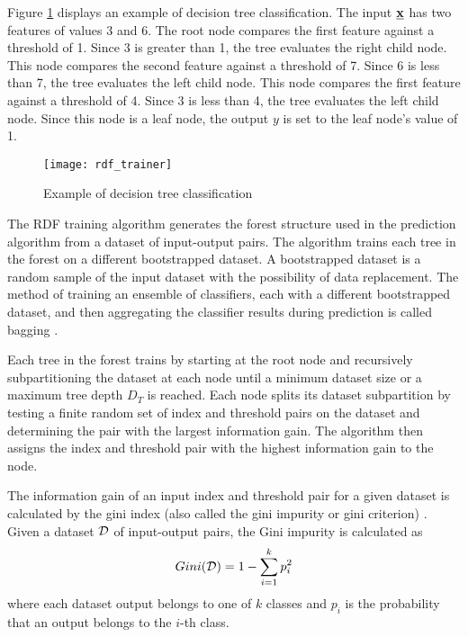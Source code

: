Figure \ref{fig:rdf_example} displays an example of decision tree classification. The input $\underline{\mathbf{x}}$ has two features of values 3 and 6. The root node compares the first feature against a threshold of 1. Since 3 is greater than 1, the tree evaluates the right child node. This node compares the second feature against a threshold of 7. Since 6 is less than 7, the tree evaluates the left child node. This node compares the first feature against a threshold of 4. Since 3 is less than 4, the tree evaluates the left child node. Since this node is a leaf node, the output $y$ is set to the leaf node's value of 1.

\begin{figure} [!h]
  \centering
  \texttt{[image: rdf\_trainer]}
  \caption{Example of decision tree classification}
  \label{fig:rdf_example}
\end{figure}

The RDF training algorithm generates the forest structure used in the prediction algorithm from a dataset of input-output pairs. The algorithm trains each tree in the forest on a different bootstrapped dataset. A bootstrapped dataset is a random sample of the input dataset with the possibility of data replacement. The method of training an ensemble of classifiers, each with a different bootstrapped dataset, and then aggregating the classifier results during prediction is called bagging \cite{Breiman1996}.

Each tree in the forest trains by starting at the root node and recursively subpartitioning the dataset at each node until a minimum dataset size or a maximum tree depth $D_T$ is reached. Each node splits its dataset subpartition by testing a finite random set of index and threshold pairs on the dataset and determining the pair with the largest information gain. The algorithm then assigns the index and threshold pair with the highest information gain to the node.

The information gain of an input index and threshold pair for a given dataset is calculated by the gini index (also called the gini impurity or gini criterion) \cite{Gini1936,Gelfand1991}. Given a dataset $\mathcal{D}$ of input-output pairs, the Gini impurity is calculated as
%
\begin{equation}
  \label{eq:gini}
  Gini(\mathcal{D}) = 1 - \sum_{i=1}^{k} p_i^2
\end{equation}
%
where each dataset output belongs to one of $k$ classes and $p_i$ is the probability that an output belongs to the $i$-th class.

